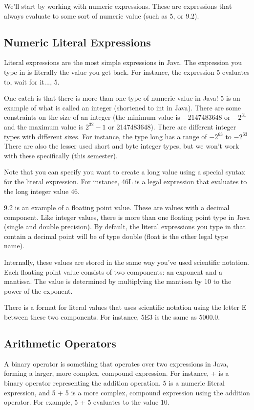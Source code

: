 We'll start by working with numeric expressions. These are expressions that always 
evaluate to some sort of numeric value (such as 5, or 9.2). 

\subsection{Numeric Literal Expressions}

Literal expressions are the most simple expressions in Java. The expression you type 
in is literally the value you get back. For instance, the expression 5 evaluates to, 
wait for it...,  5.  

One catch is that there is more than one type of numeric value in Java! 5 is an example
of what is called an integer (shortened to int in Java). There are some constraints on the size of an integer (the minimum value is −2147483648 or $-2^{31}$ and the maximum
value is $2^{32}-1$ or 2147483648). There are different integer types with different sizes. For instance, 
the type long has a range of $-2^{63}$ to $-2^{63}$ There are also the lesser used short and byte 
integer types, but we won't work with these specifically (this semester). 

Note that you can specify you want to create a long value using a special syntax for 
the literal expression. For instance, 46L is a legal expression that evaluates to 
the long integer value 46. 

9.2 is an example of a floating point value. These are values with a decimal 
component. Like integer values, there is more than one floating point type in Java 
(single and double precision). By default, the literal expressions you type in that 
contain a decimal point will be of type double (float is the other legal type name). 

Internally, these values are stored in the same way you've used scientific notation. Each floating point value consists of two components: an exponent and a mantissa. The value is determined by multiplying the mantissa by 10 to the power 
of the exponent. 
 
There is a format for literal values that uses scientific notation using the letter E between these two components. For instance, 5E3 is the same as $5000.0$. 

\subsection{Arithmetic Operators}

A binary operator is something that operates over two expressions in Java, forming a larger, more complex, compound expression. For instance, + is a binary operator representing the addition operation. 5 is a numeric literal expression, and 5 + 5 is a more complex, compound expression using the addition operator. For example, 5 + 5 evaluates to the value 10. 


